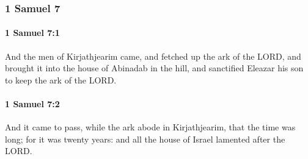 	\subsubsection{1 Samuel 7} %
		\label{1SAMUEL-7}

		\paragraph{1 Samuel 7:1} %
			\label{1SAMUEL-7-1}

			And the men of Kirjathjearim came, and fetched up the ark of the LORD, and brought it into the house of Abinadab in the hill, and sanctified Eleazar his son to keep the ark of the LORD.


		\paragraph{1 Samuel 7:2} %
			\label{1SAMUEL-7-2}

			And it came to pass, while the ark abode in Kirjathjearim, that the time was long; for it was twenty years: and all the house of Israel lamented after the LORD.

